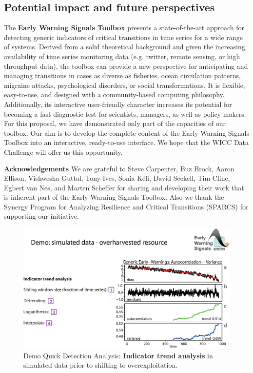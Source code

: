 \documentclass[12pt,a4paper,final]{article}
\begin{document}
\begin{doublespacing}
\section{Potential impact and future perspectives}
The \textbf{Early Warning Signals Toolbox} presents a state-of-the-art approach for detecting generic indicators of critical transitions in time series for a wide range of systems. Derived from a solid theoretical background and given the increasing availability of time series monitoring data (e.g. twitter, remote sensing, or high throughput data), the toolbox can provide a new perspective for anticipating and managing transitions in cases as diverse as fisheries, ocean circulation patterns, migraine attacks, psychological disorders, or social transformations. It is flexible, easy-to-use, and designed with a community-based computing philosophy. Additionally, its interactive user-friendly character increases its potential for becoming a fast diagnostic test for scientists, managers, as well as policy-makers. For this proposal, we have demonstrated only part of the capacities of our toolbox. Our aim is to develop the complete content of the Early Warning Signals Toolbox into an interactive, ready-to-use interface. We hope that the WICC Data Challenge will offer us this opportunity.\\

\end{doublespacing}
\newpage
{\small
\textbf{Acknowledgements}
We are grateful to Steve Carpenter, Buz Brock, Aaron Ellison, Vishwesha Guttal, Tony Ives, Sonia K\'{e}fi, David Seekell, Tim Cline, Egbert van Nes, and Marten Scheffer for sharing and developing their work that is inherent part of the Early Warning Signals Toolbox. Also we thank the Synergy Program for Analyzing Resilience and Critical Transitions  (SPARCS) for supporting our initiative.



%
%
}

\newpage
\begin{figure}[ht]
\begin{center}
\includegraphics[scale=0.8]{fig_3_simulated_generic.eps}
\caption{Demo Quick Detection Analysis: \textbf{Indicator trend analysis} in simulated data prior to shifting to overexploitation.}
\end{center}
\label{fig:simulated_generic}
\end{figure} 
\end{document}
